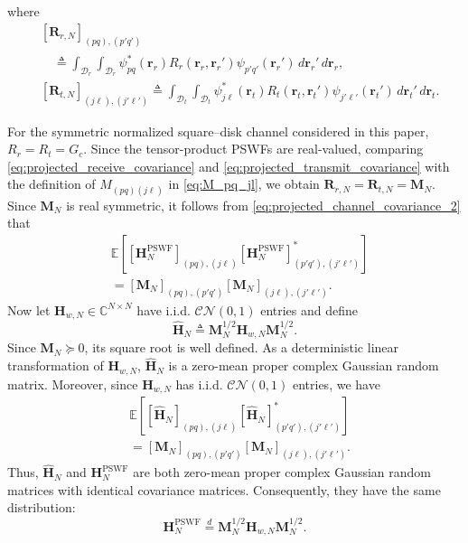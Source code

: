 \documentclass[lettersize,journal]{IEEEtran}
\theoremstyle{plain}
\begin{document}
where
\begin{align}
	&[\mathbf R_{r,N}]_{(pq),(p'q')}\nonumber \\
	&\quad \triangleq
	\int_{\mathcal D_r}\int_{\mathcal D_r}
	\psi_{pq}^{*}(\mathbf r_r)
	R_r(\mathbf r_r,\mathbf r_r')
	\psi_{p'q'}(\mathbf r_r')
	\,d\mathbf r_r'\,d\mathbf r_r ,
	\label{eq:projected_receive_covariance}\\
	&[\mathbf R_{t,N}]_{(j\ell),(j'\ell')}
	\triangleq
	\int_{\mathcal D_t}\int_{\mathcal D_t}
	\psi_{j\ell}^{*}(\mathbf r_t)
	R_t(\mathbf r_t,\mathbf r_t')
	\psi_{j'\ell'}(\mathbf r_t')
	\,d\mathbf r_t'\,d\mathbf r_t .
	\label{eq:projected_transmit_covariance}
\end{align}

For the symmetric normalized square--disk channel considered in
this paper, $R_r=R_t=G_c$. Since the tensor-product PSWFs are real-valued, comparing
\eqref{eq:projected_receive_covariance} and
\eqref{eq:projected_transmit_covariance} with the definition of
$M_{(pq)(j\ell)}$ in \eqref{eq:M_pq_jl}, we obtain
$\mathbf R_{r,N} = \mathbf R_{t,N} = \mathbf M_N$.
Since $\mathbf M_N$ is real symmetric, it follows from
\eqref{eq:projected_channel_covariance_2} that
\begin{align}
	&\mathbb E\!
	\left[
	[\mathbf H_N^{\mathrm{PSWF}}]_{(pq),(j\ell)}
	[\mathbf H_N^{\mathrm{PSWF}}]_{(p'q'),(j'\ell')}^{*}
	\right]\nonumber \\
	& =
	[\mathbf M_N]_{(pq),(p'q')}
	[\mathbf M_N]_{(j\ell),(j'\ell')}. \nonumber
	\label{eq:projected_channel_covariance_MN}
\end{align}
Now let $\mathbf H_{w,N}\in\mathbb C^{N\times N}$ have i.i.d. $\mathcal{CN}(0,1)$ entries and define
\begin{equation}
	\widehat{\mathbf H}_N
	\triangleq
	\mathbf M_N^{1/2}
	\mathbf H_{w,N}
	\mathbf M_N^{1/2}. \nonumber
	\label{eq:projected_channel_auxiliary}
\end{equation}
Since \(\mathbf M_N\succeq0\), its square root is well defined. As a deterministic linear transformation of \(\mathbf H_{w,N}\), \(\widehat{\mathbf H}_N\) is a zero-mean proper complex Gaussian random matrix.
Moreover, since $\mathbf H_{w,N}$ has i.i.d. $\mathcal{CN}(0, 1)$ entries, we have
\begin{align}
	&\mathbb E
	\left[
	[\widehat{\mathbf H}_N]_{(pq),(j\ell)}
	[\widehat{\mathbf H}_N]_{(p'q'),(j'\ell')}^{*}
	\right]
	\nonumber\\
	&=
	[\mathbf M_N]_{(pq),(p'q')}
	[\mathbf M_N]_{(j\ell),(j'\ell')}. \nonumber
	\label{eq:auxiliary_channel_covariance}
\end{align}
Thus, $\widehat{\mathbf H}_N$ and
$\mathbf H_N^{\mathrm{PSWF}}$ are both zero-mean proper complex
Gaussian random matrices with identical covariance matrices.
Consequently, they have the same distribution:
$$
		\mathbf H_N^{\mathrm{PSWF}}
		\overset{d}{=}
		\mathbf M_N^{1/2}
		\mathbf H_{w,N}
		\mathbf M_N^{1/2}.
	\label{eq:HN_PSWF_distribution}
$$
\end{document}

